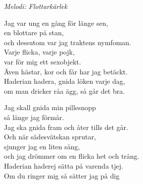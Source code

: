 {\footnotesize\textit{Melodi: Flottarkärlek}}\par
\vspace{10pt}
Jag var ung en gång för länge sen,\\
en blottare på stan,\\
och dessutom var jag traktens nymfoman.\\
Varje flicka, varje pojk,\\
var för mig ett sexobjekt.\\
Även hästar, kor och får har jag betäckt.\\
Haderian hadera, gnida löken varje dag,\\
om man dricker råa ägg, så går det bra.\par
\vspace{10pt}
Jag skall gnida min pillesnopp\\
så länge jag förmår.\\
Jag ska gnida fram och åter tills det går.\\
Och när sädesvätskan sprutar,\\
sjunger jag en liten sång,\\
och jag drömmer om en flicka het och trång.\\
Haderian haderej sätta på varenda tjej.\\
Om du ringer mig så sätter jag på dig
